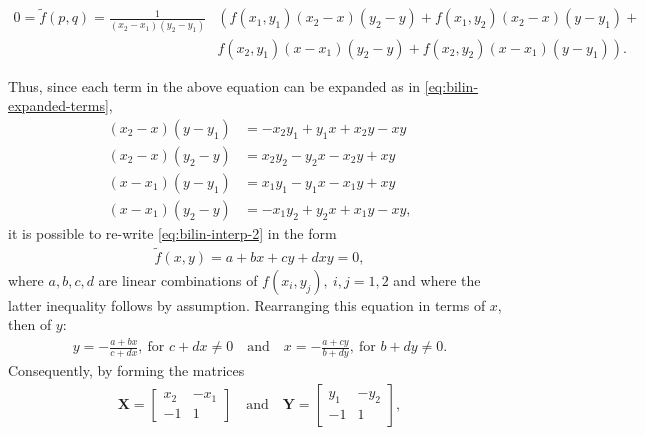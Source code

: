 \documentclass{article}
\begin{document}
\begin{align}
\label{eq:bilin-interp-2}
   0 = \tilde{f}(p,q)  = \frac{1}{(x_2-x_1)(y_2-y_1)} &\left(f(x_1,
      y_1)(x_2-x)(y_2-y) + f(x_1, y_2)(x_2-x)(y-y_1) + \right.\\
&\left.f(x_2, y_1)(x-x_1)(y_2-y) +
  f(x_2,y_2)(x-x_1)(y-y_1)\right).\nonumber
\end{align}
 
Thus, since each term in the above equation can be expanded as in
\autoref{eq:bilin-expanded-terms}, 
\begin{subequations}
\label{eq:bilin-expanded-terms}
\begin{align}
  (x_2-x)(y-y_1) &= -x_2y_1 + y_1x + x_2y - xy\\ %
  (x_2-x)(y_2-y) &= x_2y_2 - y_2x - x_2y + xy\\ %
  (x-x_1)(y-y_1) &= x_1y_1 - y_1x - x_1y + xy\\ %
  (x-x_1)(y_2-y) &= -x_1y_2 + y_2x + x_1y - xy, %
\end{align}
\end{subequations}
it is possible to re-write \autoref{eq:bilin-interp-2} in the form
\begin{align*}
  \tilde{f}(x,y) = a + bx + cy + dxy = 0,
\end{align*}
where $a, b, c, d$ are linear combinations of $f(x_i, y_j), ~i,j =
1,2$ and where the latter inequality follows by
assumption. Rearranging this equation in terms of $x$, then of
$y$:
\begin{align*}
  y = -\frac{a + bx}{c+dx}, ~ \text{for }c+dx\neq0
  \quad \text{and} \quad 
  x = -\frac{a+cy}{b+dy}, ~ \text{for }b+dy \neq 0.
\end{align*}
Consequently, by forming the matrices
\begin{align*}
  \mathbf{X} = \left[
    \begin{array}{rr}
      x_2 & -x_1\\
      -1 & 1
    \end{array}
\right]\quad\text{and}\quad
\mathbf{Y} = \left[
  \begin{array}{rr}
    y_1 & -y_2\\
    -1 & 1
  \end{array}\right],
\end{align*}
%
\end{document}
